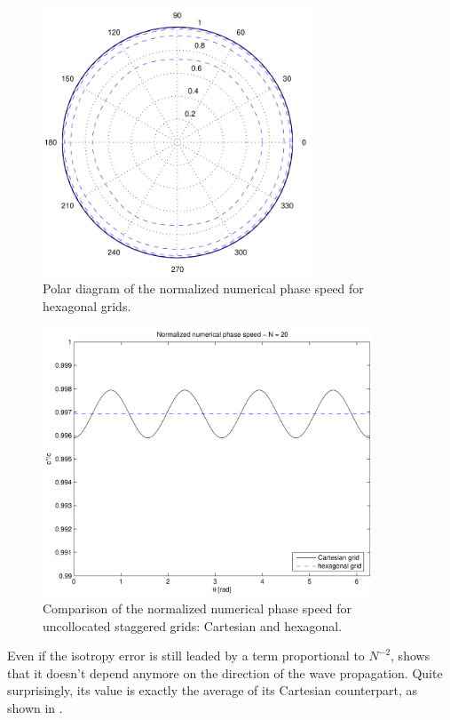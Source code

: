 \begin{figure}[htbp]
  \begin{center}
    \includegraphics[height=8cm]{pics/liu_fourier_fig5b}
  \end{center}
  \caption{Polar diagram of the normalized numerical phase speed for
    hexagonal grids.}
  \label{fig:numerical_c_polar_hex}
\end{figure}  

\begin{figure}[htbp]
  \begin{center}
    \includegraphics[height=8cm]{pics/liu_fourier_fig6}
  \end{center}
  \caption{Comparison of the normalized numerical phase speed for
    uncollocated staggered grids: Cartesian and hexagonal.}
  \label{fig:numerical_c_hex}
\end{figure}  

Even if the isotropy error is still leaded by a term proportional to
$N^{-2}$,  shows that it doesn't
depend anymore on the direction of the wave propagation. Quite
surprisingly, its value is exactly the average of its Cartesian
counterpart, as shown in .

